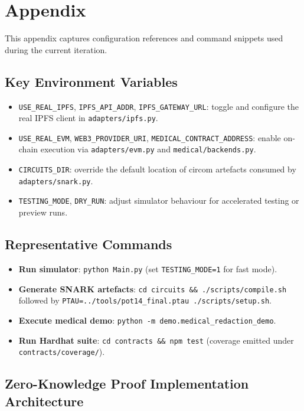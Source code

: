 \appendix

\section{Appendix}

This appendix captures configuration references and command snippets used during the current iteration.

\subsection{Key Environment Variables}
\begin{itemize}
    \item \texttt{USE\_REAL\_IPFS}, \texttt{IPFS\_API\_ADDR}, \texttt{IPFS\_GATEWAY\_URL}: toggle and configure the real IPFS client in \texttt{adapters/ipfs.py}.
    \item \texttt{USE\_REAL\_EVM}, \texttt{WEB3\_PROVIDER\_URI}, \texttt{MEDICAL\_CONTRACT\_ADDRESS}: enable on-chain execution via \texttt{adapters/evm.py} and \texttt{medical/backends.py}.
    \item \texttt{CIRCUITS\_DIR}: override the default location of circom artefacts consumed by \texttt{adapters/snark.py}.
    \item \texttt{TESTING\_MODE}, \texttt{DRY\_RUN}: adjust simulator behaviour for accelerated testing or preview runs.
\end{itemize}

\subsection{Representative Commands}
\begin{itemize}
    \item \textbf{Run simulator}: \texttt{python Main.py} (set \texttt{TESTING\_MODE=1} for fast mode).
    \item \textbf{Generate SNARK artefacts}: \texttt{cd circuits \&\& ./scripts/compile.sh} followed by \texttt{PTAU=../tools/pot14\_final.ptau ./scripts/setup.sh}.
    \item \textbf{Execute medical demo}: \texttt{python -m demo.medical\_redaction\_demo}.
    \item \textbf{Run Hardhat suite}: \texttt{cd contracts \&\& npm test} (coverage emitted under \texttt{contracts/coverage/}).
\end{itemize}

\subsection{Zero-Knowledge Proof Implementation Architecture}

